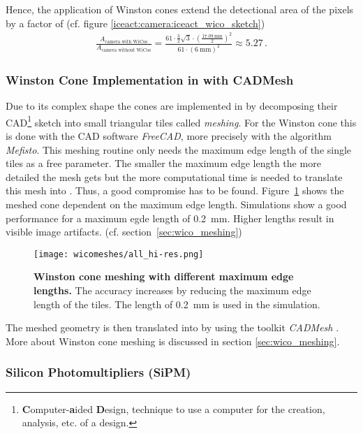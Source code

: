 Hence, the application of Winston cones extend the detectional area of the pixels by a factor of (cf. figure \ref{iceact:camera:iceact_wico_sketch})
\begin{align}
	\frac{A_\text{camera with WiCos}}{A_\text{camera without WiCos}} = \frac{61\cdot \frac{3}{2}\sqrt{3}\cdot\left(\frac{\SI{17.09}{\milli\meter}}{2}\right)^2}{61\cdot(\SI{6}{\milli\meter})^2}\approx\num{5.27}\,.
\end{align}

\subsubsection{Winston Cone Implementation in \geant with CADMesh}

Due to its complex shape the cones are implemented in \geant by decomposing their CAD\footnote{\textbf{C}omputer-\textbf{a}ided \textbf{D}esign, technique to use a computer for the creation, analysis, etc. of a design.} sketch into small triangular tiles called \textit{meshing}. For the \iceact Winston cone this is done with the CAD software \textit{FreeCAD}, more precisely with the algorithm \textit{Mefisto}. This meshing routine only needs the maximum edge length of the single tiles as a free parameter. The smaller the maximum edge length the more detailed the mesh gets but the more computational time is needed to translate this mesh into \geant. Thus, a good compromise has to be found. Figure~\ref{wico:meshing} shows the meshed cone dependent on the maximum edge length. Simulations show a good performance for a maximum egde length of \SI{0.2}{\milli\meter}. Higher lengths result in visible image artifacts. (cf. section~\ref{sec:wico_meshing}) 

\begin{figure}[H]
	\centering
	\texttt{[image: wicomeshes/all\_hi-res.png]}
	\caption[\iceact Winston cone meshing with different maximum edge lengths]{\textbf{\iceact Winston cone meshing with different maximum edge lengths.} The accuracy increases by reducing the maximum edge length of the tiles. The length of \SI{0.2}{\milli\meter} is used in the simulation.}
	\label{wico:meshing}	
\end{figure}

The meshed geometry is then translated into \geant by using the toolkit \textit{CADMesh} \cite{wico:cadmesh}. More about Winston cone meshing is discussed in section \ref{sec:wico_meshing}.

\subsubsection{Silicon Photomultipliers (SiPM)}\label{sec:sipm:working_principle}

